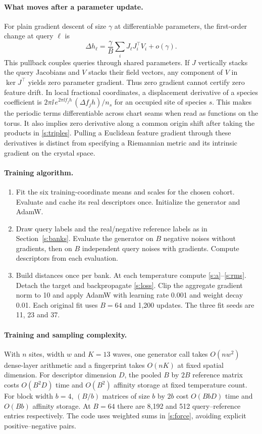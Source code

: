 \paragraph{What moves after a parameter update.}
For plain gradient descent of size $\gamma$ at differentiable parameters, the first-order change at query $\ell$ is
\[
 \Delta h_\ell=\frac{\gamma}{B}\sum_i J_\ell J_i^\top V_i+o(\gamma).
\]
This pullback couples queries through shared parameters. If $J$ vertically stacks the query Jacobians and $V$ stacks their field vectors, any component of $V$ in $\ker J^\top$ yields zero parameter gradient. Thus zero gradient cannot certify zero feature drift. In local fractional coordinates, a displacement derivative of a species coefficient is $2\pi\ii\,e^{2\pi\ii f_jh}\,(\Delta f_j h)/n_s$ for an occupied site of species $s$. This makes the periodic terms differentiable across chart seams when read as functions on the torus. It also implies zero derivative along a common origin shift after taking the products in \eqref{s:triples}. Pulling a Euclidean feature gradient through these derivatives is distinct from specifying a Riemannian metric and its intrinsic gradient on the crystal space.

\paragraph{Training algorithm.}
\begin{enumerate}
\item Fit the six training-coordinate means and scales for the chosen cohort. Evaluate and cache its real descriptors once. Initialize the generator and AdamW.
\item Draw query labels and the real/negative reference labels as in Section~\ref{s:banks}. Evaluate the generator on $B$ negative noises without gradients, then on $B$ independent query noises with gradients. Compute descriptors from each evaluation.
\item Build distances once per bank. At each temperature compute \eqref{s:a}--\eqref{s:rms}. Detach the target and backpropagate \eqref{s:loss}. Clip the aggregate gradient norm to 10 and apply AdamW with learning rate 0.001 and weight decay 0.01. Each original fit uses $B=64$ and 1,200 updates. The three fit seeds are 11, 23 and 37.
\end{enumerate}
\paragraph{Training and sampling complexity.}
With $n$ sites, width $w$ and $K=13$ waves, one generator call takes $O(nw^2)$ dense-layer arithmetic and a fingerprint takes $O(nK)$ at fixed spatial dimension. For descriptor dimension $D$, the pooled $B$ by $2B$ reference matrix costs $O(B^2D)$ time and $O(B^2)$ affinity storage at fixed temperature count. For block width $b=4$, $(B/b)$ matrices of size $b$ by $2b$ cost $O(BbD)$ time and $O(Bb)$ affinity storage. At $B=64$ there are 8,192 and 512 query--reference entries respectively. The code uses weighted sums in \eqref{s:force}, avoiding explicit positive--negative pairs.

